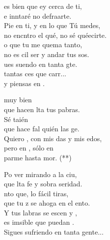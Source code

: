 \begin{cancion}[Piensas en mí][Nico]%
	es bien que ey cerca de ti,\\
	e inntaré no defraarte.\\
	Pie en ti, y en lo que Tú medes,\\
	no encntro el qué, no sé quéecirte.\\
	o que tu  me quema tanto,\\
	no es cil ser y andar tus sos. \\
	\jump
	ues suendo en tanta gte. \\
	 tantas ces que carr...\\
	y  piensas en .  \jump\\
	\begin{chorus}%
		 muy bien  \\
		que hacen lta tus pabras.\\
		Sé taién \\
		que hace fal quién las ge.\\
		Quiero , con mis das y mis edos,\\
		pero en , sólo en\\
		parme hasta mor. (**)\jump\\
	\end{chorus}%
	Po ver mirando a la ciu,\\
	que lta fe y sobra seridad.\\
	nto que, lo fácil tiras, \\
	que tu z se ahoga en el ento.\\
	Y tus labras se escen y , \\
	es imsible que puedan .\\
	\jump
Sigues sufriendo en tanta gente...\\
\end{cancion}%

